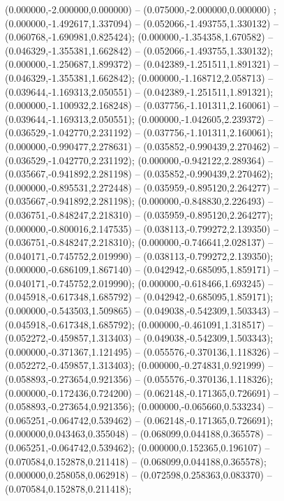  (0.000000,-2.000000,0.000000) -- (0.075000,-2.000000,0.000000) ;
 (0.000000,-1.492617,1.337094) -- (0.052066,-1.493755,1.330132) -- (0.060768,-1.690981,0.825424);
 (0.000000,-1.354358,1.670582) -- (0.046329,-1.355381,1.662842) -- (0.052066,-1.493755,1.330132);
 (0.000000,-1.250687,1.899372) -- (0.042389,-1.251511,1.891321) -- (0.046329,-1.355381,1.662842);
 (0.000000,-1.168712,2.058713) -- (0.039644,-1.169313,2.050551) -- (0.042389,-1.251511,1.891321);
 (0.000000,-1.100932,2.168248) -- (0.037756,-1.101311,2.160061) -- (0.039644,-1.169313,2.050551);
 (0.000000,-1.042605,2.239372) -- (0.036529,-1.042770,2.231192) -- (0.037756,-1.101311,2.160061);
 (0.000000,-0.990477,2.278631) -- (0.035852,-0.990439,2.270462) -- (0.036529,-1.042770,2.231192);
 (0.000000,-0.942122,2.289364) -- (0.035667,-0.941892,2.281198) -- (0.035852,-0.990439,2.270462);
 (0.000000,-0.895531,2.272448) -- (0.035959,-0.895120,2.264277) -- (0.035667,-0.941892,2.281198);
 (0.000000,-0.848830,2.226493) -- (0.036751,-0.848247,2.218310) -- (0.035959,-0.895120,2.264277);
 (0.000000,-0.800016,2.147535) -- (0.038113,-0.799272,2.139350) -- (0.036751,-0.848247,2.218310);
 (0.000000,-0.746641,2.028137) -- (0.040171,-0.745752,2.019990) -- (0.038113,-0.799272,2.139350);
 (0.000000,-0.686109,1.867140) -- (0.042942,-0.685095,1.859171) -- (0.040171,-0.745752,2.019990);
 (0.000000,-0.618466,1.693245) -- (0.045918,-0.617348,1.685792) -- (0.042942,-0.685095,1.859171);
 (0.000000,-0.543503,1.509865) -- (0.049038,-0.542309,1.503343) -- (0.045918,-0.617348,1.685792);
 (0.000000,-0.461091,1.318517) -- (0.052272,-0.459857,1.313403) -- (0.049038,-0.542309,1.503343);
 (0.000000,-0.371367,1.121495) -- (0.055576,-0.370136,1.118326) -- (0.052272,-0.459857,1.313403);
 (0.000000,-0.274831,0.921999) -- (0.058893,-0.273654,0.921356) -- (0.055576,-0.370136,1.118326);
 (0.000000,-0.172436,0.724200) -- (0.062148,-0.171365,0.726691) -- (0.058893,-0.273654,0.921356);
 (0.000000,-0.065660,0.533234) -- (0.065251,-0.064742,0.539462) -- (0.062148,-0.171365,0.726691);
 (0.000000,0.043463,0.355048) -- (0.068099,0.044188,0.365578) -- (0.065251,-0.064742,0.539462);
 (0.000000,0.152365,0.196107) -- (0.070584,0.152878,0.211418) -- (0.068099,0.044188,0.365578);
 (0.000000,0.258058,0.062918) -- (0.072598,0.258363,0.083370) -- (0.070584,0.152878,0.211418);
